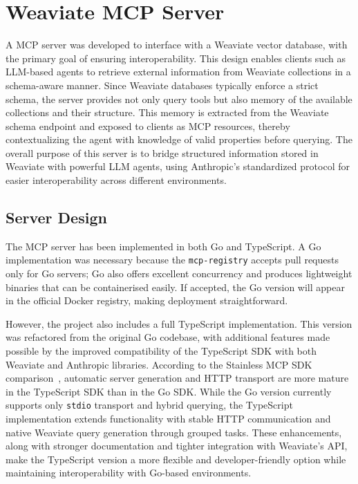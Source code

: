 \section{Weaviate MCP Server}

A \ac{MCP} server was developed to interface with a Weaviate vector database, with the primary goal of ensuring interoperability. This design enables clients such as \ac{LLM}-based agents to retrieve external information from Weaviate collections in a schema-aware manner. Since Weaviate databases typically enforce a strict schema, the server provides not only query tools but also memory of the available collections and their structure. This memory is extracted from the Weaviate schema endpoint and exposed to clients as MCP resources, thereby contextualizing the agent with knowledge of valid properties before querying. The overall purpose of this server is to bridge structured information stored in Weaviate with powerful \ac{LLM} agents, using Anthropic’s standardized protocol for easier interoperability across different environments.

\subsection{Server Design}

The MCP server has been implemented in both Go and TypeScript. A Go implementation was necessary because the \texttt{mcp-registry} accepts pull requests only for Go servers; Go also offers excellent concurrency and produces lightweight binaries that can be containerised easily. If accepted, the Go version will appear in the official Docker registry, making deployment straightforward.

However, the project also includes a full TypeScript implementation. This version was refactored from the original Go codebase, with additional features made possible by the improved compatibility of the TypeScript SDK with both Weaviate and Anthropic libraries. According to the Stainless MCP SDK comparison~\cite{stainless_mcp_comparison}, automatic server generation and HTTP transport are more mature in the TypeScript SDK than in the Go SDK. While the Go version currently supports only \texttt{stdio} transport and hybrid querying, the TypeScript implementation extends functionality with stable HTTP communication and native Weaviate query generation through grouped tasks. These enhancements, along with stronger documentation and tighter integration with Weaviate’s API, make the TypeScript version a more flexible and developer-friendly option while maintaining interoperability with Go-based environments.


